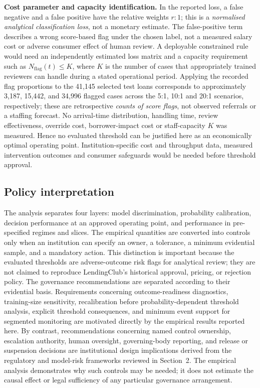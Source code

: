 \documentclass[10pt]{article}
\begin{document}
\noindent\textbf{Cost parameter and capacity identification.} In the reported loss, a false negative and a false positive have the relative weights \(r:1\); this is a \emph{normalised analytical classification loss}, not a monetary estimate. The false-positive term describes a wrong score-based flag under the chosen label, not a measured salary cost or adverse consumer effect of human review. A deployable constrained rule would need an independently estimated loss matrix and a capacity requirement such as \(N_{\mathrm{flag}}(t)\leq K\), where \(K\) is the number of cases that appropriately trained reviewers can handle during a stated operational period. Applying the recorded flag proportions to the 41,145 selected test loans corresponds to approximately 3,187, 15,442, and 34,996 flagged cases across the 5:1, 10:1 and 20:1 scenarios, respectively; these are retrospective \emph{counts of score flags}, not observed referrals or a staffing forecast. No arrival-time distribution, handling time, review effectiveness, override cost, borrower-impact cost or staff-capacity \(K\) was measured. Hence no evaluated threshold can be justified here as an economically optimal operating point. Institution-specific cost and throughput data, measured intervention outcomes and consumer safeguards would be needed before threshold approval.

\subsection{Policy interpretation}

The analysis separates four layers: model discrimination, probability calibration, decision performance at an approved operating point, and performance in pre-specified regimes and slices. The empirical quantities are converted into controls only when an institution can specify an owner, a tolerance, a minimum evidential sample, and a mandatory action. This distinction is important because the evaluated thresholds are adverse-outcome risk flags for analytical review; they are not claimed to reproduce LendingClub's historical approval, pricing, or rejection policy. The governance recommendations are separated according to their evidential basis. Requirements concerning outcome-readiness diagnostics, training-size sensitivity, recalibration before probability-dependent threshold analysis, explicit threshold consequences, and minimum event support for segmented monitoring are motivated directly by the empirical results reported here. By contrast, recommendations concerning named control ownership, escalation authority, human oversight, governing-body reporting, and release or suspension decisions are institutional design implications derived from the regulatory and model-risk frameworks reviewed in Section~2. The empirical analysis demonstrates why such controls may be needed; it does not estimate the causal effect or legal sufficiency of any particular governance arrangement.
\end{document}
